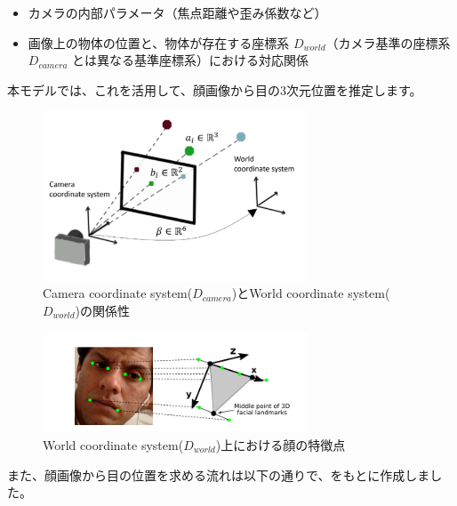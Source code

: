 \begin{itemize}
    \item カメラの内部パラメータ（焦点距離や歪み係数など）
    \item 画像上の物体の位置と、物体が存在する座標系 $D_{world}$（カメラ基準の座標系 $D_{camera}$ とは異なる基準座標系）における対応関係
\end{itemize}

本モデルでは、これを活用して、顔画像から目の3次元位置を推定します。

\begin{figure}[htbp]
    \centering
    \includegraphics[width=0.7\textwidth]{eye-track-cursor/fig/camera_world_coordinate.png}
    \caption{Camera coordinate system($D_{camera}$)とWorld coordinate system($D_{world}$)の関係性}
    \label{fig:camera_world_coordinate}
\end{figure}

\begin{figure}[htbp]
    \centering
    \includegraphics[width=0.7\textwidth]{eye-track-cursor/fig/world_coordinate.png}
    \caption{World coordinate system($D_{world}$)上における顔の特徴点}
    \label{fig:world_coordinate}
\end{figure}

また、顔画像から目の位置を求める流れは以下の通りで、\cite{zhang2017mpiigaze}をもとに作成しました。

